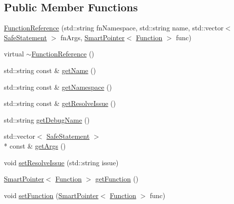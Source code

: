 \subsection*{Public Member Functions}
\begin{DoxyCompactItemize}
\item 
\hyperlink{class_scribble_core_1_1_function_reference_a79bf4edbc9e885b8950d599fa87be039}{Function\-Reference} (std\-::string fn\-Namespace, std\-::string name, std\-::vector$<$ \hyperlink{namespace_scribble_core_a2ad5bf236bc9164cb56f564685f15a11}{Safe\-Statement} $>$ fn\-Args, \hyperlink{_smart_pointer_8hpp_afdd8d4ba81c3fcbdeacf1dafba2accfb}{Smart\-Pointer}$<$ \hyperlink{class_a_p_i_1_1_function}{Function} $>$ func)
\item 
virtual \hyperlink{class_scribble_core_1_1_function_reference_ad242511d83228261b66e12803057ac21}{$\sim$\-Function\-Reference} ()
\item 
std\-::string const \& \hyperlink{class_scribble_core_1_1_function_reference_a3503eee3d549b5c6f414950f62bbca33}{get\-Name} ()
\item 
std\-::string const \& \hyperlink{class_scribble_core_1_1_function_reference_a5a9260934ab22f221958f6f4e9741b1a}{get\-Namespace} ()
\item 
std\-::string const \& \hyperlink{class_scribble_core_1_1_function_reference_a29fad58add2d8262c02b842269046d37}{get\-Resolve\-Issue} ()
\item 
std\-::string \hyperlink{class_scribble_core_1_1_function_reference_a84339654ac185758f59f759d0de3d74d}{get\-Debug\-Name} ()
\item 
std\-::vector$<$ \hyperlink{namespace_scribble_core_a2ad5bf236bc9164cb56f564685f15a11}{Safe\-Statement} $>$\\*
 const \& \hyperlink{class_scribble_core_1_1_function_reference_a2972619b5377b0c600556523b9083c90}{get\-Args} ()
\item 
void \hyperlink{class_scribble_core_1_1_function_reference_ac081e81ae34f67451ae821b94f8a85d2}{set\-Resolve\-Issue} (std\-::string issue)
\item 
\hyperlink{_smart_pointer_8hpp_afdd8d4ba81c3fcbdeacf1dafba2accfb}{Smart\-Pointer}$<$ \hyperlink{class_a_p_i_1_1_function}{Function} $>$ \hyperlink{class_scribble_core_1_1_function_reference_a16a015b1d50b2d21431bf9e30e19e355}{get\-Function} ()
\item 
void \hyperlink{class_scribble_core_1_1_function_reference_a4e3f9133a8ec183ad68e8d2ddba059c7}{set\-Function} (\hyperlink{_smart_pointer_8hpp_afdd8d4ba81c3fcbdeacf1dafba2accfb}{Smart\-Pointer}$<$ \hyperlink{class_a_p_i_1_1_function}{Function} $>$ func)
\end{DoxyCompactItemize}


